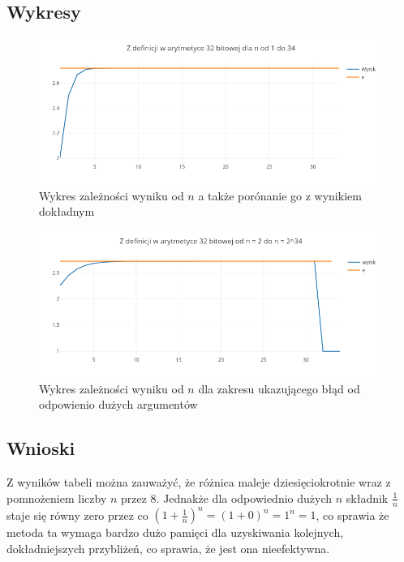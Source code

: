 \documentclass{article}
\begin{document}
\subsection{Wykresy}
\begin{figure}[ht]
  \begin{center}
  \includegraphics[width=15cm]{d}
  \end{center}
  \caption{Wykres zależności wyniku od $n$ a także porónanie go z wynikiem dokładnym}
  \label{fig:rysunek1}
\end{figure}
\begin{figure}[ht]
  \begin{center}
  \includegraphics[width=15cm]{d2}
  \end{center}
  \caption{Wykres zależności wyniku od $n$ dla zakresu ukazującego błąd od odpowienio dużych argumentów}
  \label{fig:rysunek2}
\end{figure}


\subsection{Wnioski}
Z wyników tabeli można zauważyć, że różnica maleje dziesięciokrotnie wraz z pomnożeniem liczby $n$ przez 8. Jednakże dla odpowiednio dużych $n$ składnik $\frac{1}{n}$ staje się równy zero przez co $(1+\frac{1}{n})^{n} = (1+0)^{n} = 1^{n} = 1$, co sprawia że metoda ta wymaga bardzo dużo pamięci dla uzyskiwania kolejnych, dokładniejszych przybliżeń, co sprawia, że jest ona nieefektywna.
\newpage
\end{document}
